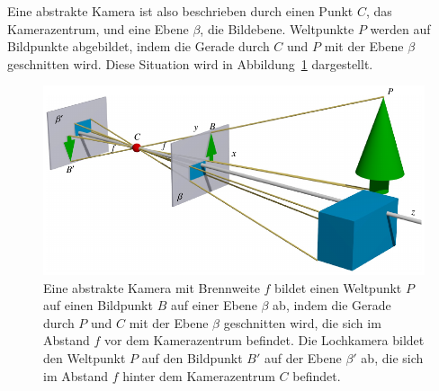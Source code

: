 Eine abstrakte Kamera ist also beschrieben durch einen Punkt $C$,
das Kamerazentrum, und eine Ebene $\beta$, die Bildebene.
Weltpunkte $P$ werden auf Bildpunkte abgebildet, indem die Gerade
durch $C$ und $P$ mit der Ebene $\beta$ geschnitten wird.
Diese Situation wird in Abbildung~\ref{applications:kamera:abstrakt}
dargestellt.
\begin{figure}
\centering
\includegraphics{applications/kamera/abstrakt.pdf}
\caption{Eine abstrakte Kamera mit Brennweite $f$ bildet einen Weltpunkt
$P$ auf einen Bildpunkt $B$ auf einer Ebene $\beta$ ab,
indem die
Gerade durch $P$ und $C$ mit der Ebene $\beta$ geschnitten wird,
die sich im Abstand $f$ vor dem Kamerazentrum befindet.
Die Lochkamera bildet den Weltpunkt $P$ auf den Bildpunkt $B'$ auf der
Ebene $\beta'$ ab, die sich im Abstand $f$ hinter dem Kamerazentrum $C$
befindet.
\label{applications:kamera:abstrakt}}
\end{figure}

